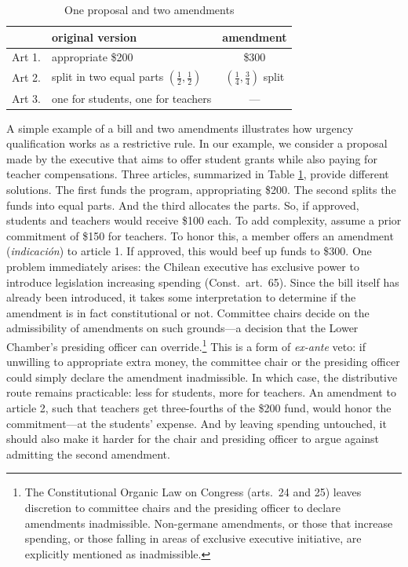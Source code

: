 \documentclass[letter,12pt]{article}
\begin{document}
\begin{table}
\centering
\caption{One proposal and two amendments}\label{T:example}
\noindent \begin{tabular}{llc}
       & original version                   & amendment                                        \\ \hline
Art 1. & appropriate \$200                  & \$300                                            \\
Art 2. & split in two equal parts $(\frac{1}{2}, \frac{1}{2})$          & $(\frac{1}{4}, \frac{3}{4})$ split \\
Art 3. & one for students, one for teachers & ---                                              \\
\end{tabular}
\end{table}

A simple example of a bill and two amendments illustrates how urgency qualification works as a restrictive rule. In our example, we consider a proposal made by the executive that aims to offer student grants while also paying for teacher compensations. Three articles, summarized in Table \ref{T:example}, provide different solutions. The first funds the program, appropriating \$200. The second splits the funds into equal parts. And the third allocates the parts. So, if approved, students and teachers would receive \$100 each. To add complexity, assume a prior commitment of \$150 for teachers. To honor this, a member offers an amendment (\emph{indicación}) to article 1. If approved, this would beef up funds to \$300. One problem immediately arises: the Chilean executive has exclusive power to introduce legislation increasing spending (Const.\ art.\ 65). Since the bill itself has already been introduced, it takes some interpretation to determine if the amendment is in fact constitutional or not. Committee chairs decide on the admissibility of amendments on such grounds---a decision that the Lower Chamber's presiding officer can override.\footnote{The Constitutional Organic Law on Congress (arts.\ 24 and 25) leaves discretion to committee chairs and the presiding officer to declare amendments inadmissible. Non-germane amendments, or those that increase spending, or those falling in areas of exclusive executive initiative, are explicitly mentioned as inadmissible.} This is a form of \emph{ex-ante} veto: if unwilling to appropriate extra money, the committee chair or the presiding officer could simply declare the amendment inadmissible. In which case, the distributive route remains practicable: less for students, more for teachers. An amendment to article 2, such that teachers get three-fourths of the \$200 fund, would honor the commitment---at the students' expense. And by leaving spending untouched, it should also make it harder for the chair and presiding officer to argue against admitting the second amendment. 
\end{document}
